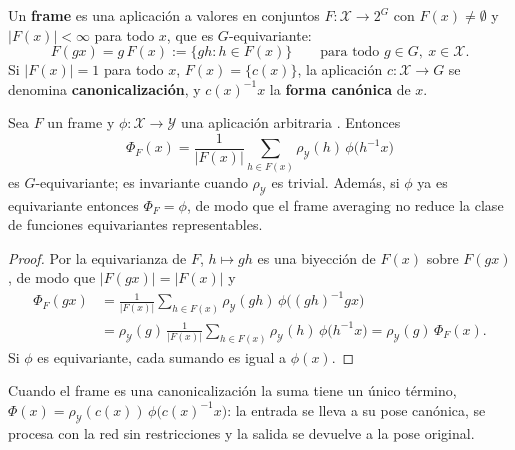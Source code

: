 \begin{definition}[Frame]\label{def:frame_equivariante}
Un \textbf{frame} es una aplicación a valores en conjuntos $F: \mathcal{X} \to 2^G$ con $F(x) \neq \emptyset$ y $|F(x)| < \infty$ para todo $x$, que es $G$-equivariante:
\[F(gx) = g\,F(x) := \{ gh : h \in F(x) \} \qquad \text{para todo } g \in G,\ x \in \mathcal{X}.\]
Si $|F(x)| = 1$ para todo $x$, $F(x) = \{c(x)\}$, la aplicación $c: \mathcal{X} \to G$ se denomina \textbf{canonicalización}, y $c(x)^{-1}x$ la \textbf{forma canónica} de $x$.
\end{definition}

\begin{theorem}\label{thm:frame_averaging}
Sea $F$ un frame y $\phi: \mathcal{X} \to \mathcal{Y}$ una aplicación arbitraria \citep{puny2022frameaveraging}. Entonces
\[\Phi_F(x) = \frac{1}{|F(x)|} \sum_{h \in F(x)} \rho_{\mathcal{Y}}(h)\, \phi\big(h^{-1}x\big)\]
es $G$-equivariante; es invariante cuando $\rho_{\mathcal{Y}}$ es trivial. Además, si $\phi$ ya es equivariante entonces $\Phi_F = \phi$, de modo que el frame averaging no reduce la clase de funciones equivariantes representables.
\end{theorem}

\begin{proof}
Por la equivarianza de $F$, $h \mapsto gh$ es una biyección de $F(x)$ sobre $F(gx)$, de modo que $|F(gx)| = |F(x)|$ y
\begin{align*}
\Phi_F(gx) &= \frac{1}{|F(x)|} \sum_{h \in F(x)} \rho_{\mathcal{Y}}(gh)\, \phi\big((gh)^{-1} gx\big) \\
&= \rho_{\mathcal{Y}}(g)\, \frac{1}{|F(x)|}\sum_{h \in F(x)} \rho_{\mathcal{Y}}(h)\, \phi\big(h^{-1}x\big) = \rho_{\mathcal{Y}}(g)\, \Phi_F(x).
\end{align*}
Si $\phi$ es equivariante, cada sumando es igual a $\phi(x)$.
\end{proof}

Cuando el frame es una canonicalización la suma tiene un único término, $\Phi(x) = \rho_{\mathcal{Y}}(c(x))\, \phi\big(c(x)^{-1}x\big)$: la entrada se lleva a su pose canónica, se procesa con la red sin restricciones y la salida se devuelve a la pose original.

